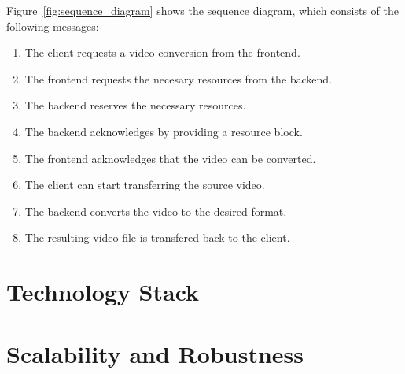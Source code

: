 \documentclass[]{article}
\begin{document}
	Figure~\ref{fig:sequence_diagram} shows the sequence diagram, which consists of the following messages:
	\begin{enumerate}
		\item The client requests a video conversion from the frontend.
		\item The frontend requests the necesary resources from the backend.
		\item The backend reserves the necessary resources. 
		\item The backend acknowledges by providing a resource block.
		\item The frontend acknowledges that the video can be converted.
		\item The client can start transferring the source video.
		\item The backend converts the video to the desired format.
		\item The resulting video file is transfered back to the client. 
	\end{enumerate}
	
\section*{Technology Stack}
\section*{Scalability and Robustness}
\end{document}
